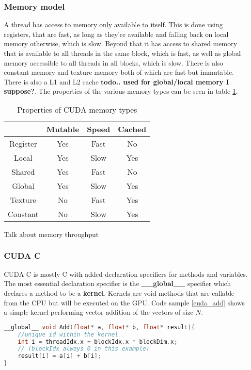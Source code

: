 \subsubsection{Memory model}
A thread has access to memory only available to itself. This is done using registers, that are fast, as long as they're available and falling back on local memory otherwise, which is slow.
Beyond that it has access to shared memory that is available to all threads in the same block, which is fast, as well as global memory accessible to all threads in all blocks, which is slow.
There is also constant memory and texture memory both of which are fast but immutable. 
There is also a L1 and L2 cache \textbf{todo.. used for global/local memory I suppose?}.
The properties of the various memory types can be seen in table \ref{table:memorytypes}.
{\renewcommand{\arraystretch}{3}%
\begin{table}[h!]
\centering
\begin{tabular}{ | c | c | c | c | }
  \hline
           & Mutable & Speed & Cached \\ \hline
  Register & Yes     & Fast  & No     \\ \hline
  Local    & Yes     & Slow  & Yes    \\ \hline
  Shared   & Yes     & Fast  & No     \\ \hline
  Global   & Yes     & Slow  & Yes    \\ \hline
  Texture  & No      & Fast  & Yes    \\ \hline
  Constant & No      & Slow  & Yes    \\ \hline

\end{tabular}
\caption{Properties of CUDA memory types\label{table:memorytypes}}
\end{table}

Talk about memory throughput

\subsubsection{CUDA C}
CUDA C is mostly C with added declaration specifiers for methods and variables. The most essential declaration specifier is the \textbf{\_\_global\_\_} specifier which declares a method to be a \textbf{kernel}. Kernels are void-methods that are callable from the CPU but will be executed on the GPU. Code sample \ref{cuda_add} shows a simple kernel performing vector addition of the vectors of size $N$.

\begin{lstlisting}[language=C++, caption=CUDA C addition kernel, label=cuda_add]
__global__ void Add(float* a, float* b, float* result){
	//unique id within the kernel
	int i = threadIdx.x + blockIdx.x * blockDim.x;
	// (blockIdx always 0 in this example)
	result[i] = a[i] + b[i];
}


\end{lstlisting}}
